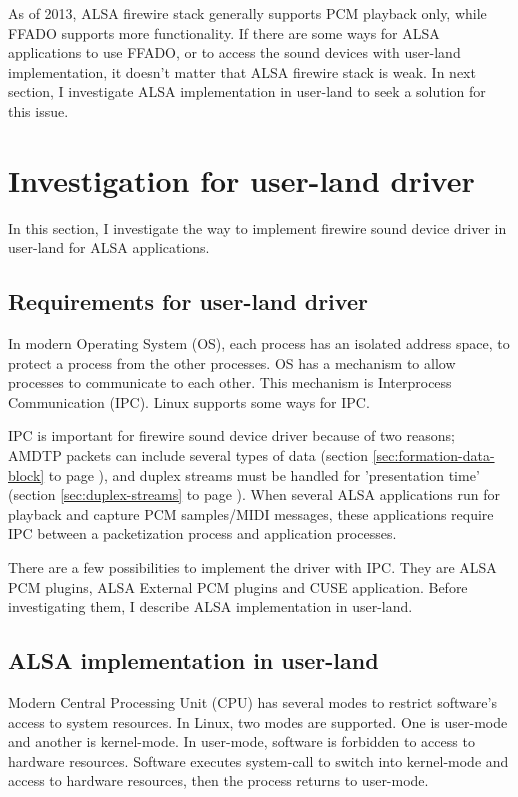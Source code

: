 \documentclass[onecolumn]{article}
\begin{document}
As of 2013, ALSA firewire stack generally supports PCM playback only, while FFADO supports more functionality. If there are some ways for ALSA applications to use FFADO, or to access the sound devices with user-land implementation, it doesn't matter that ALSA firewire stack is weak. In next section, I investigate ALSA implementation in user-land to seek a solution for this issue.


\section{Investigation for user-land driver}

In this section, I investigate the way to implement firewire sound device driver in user-land for ALSA applications.

\subsection{Requirements for user-land driver}

In modern Operating System (OS), each process has an isolated address space, to protect a process from the other processes. OS has a mechanism to allow processes to communicate to each other. This mechanism is Interprocess Communication (IPC). Linux supports some ways for IPC.

IPC is important for firewire sound device driver because of two reasons; AMDTP packets can include several types of data (section \ref{sec:formation-data-block} to page \pageref{sec:formation-data-block}), and duplex streams must be handled for 'presentation time' (section \ref{sec:duplex-streams} to page \pageref{sec:duplex-streams}). When several ALSA applications run for playback and capture PCM samples/MIDI messages, these applications require IPC between a packetization process and application processes.

There are a few possibilities to implement the driver with IPC. They are ALSA PCM plugins, ALSA External PCM plugins and CUSE application. Before investigating them, I describe ALSA implementation in user-land.

\subsection{ALSA implementation in user-land}

Modern Central Processing Unit (CPU) has several modes to restrict software's access to system resources. In Linux, two modes are supported. One is user-mode and another is kernel-mode. In user-mode, software is forbidden to access to hardware resources. Software executes system-call to switch into kernel-mode and access to hardware resources, then the process returns to user-mode.
\end{document}
